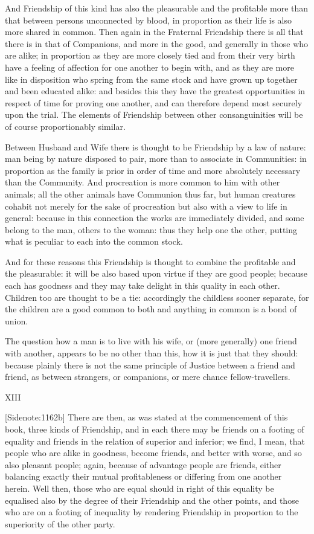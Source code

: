 And Friendship of this kind has also the pleasurable and the profitable
more than that between persons unconnected by blood, in proportion as
their life is also more shared in common. Then again in the Fraternal
Friendship there is all that there is in that of Companions, and more in
the good, and generally in those who are alike; in proportion as they
are more closely tied and from their very birth have a feeling of
affection for one another to begin with, and as they are more like in
disposition who spring from the same stock and have grown up together
and been educated alike: and besides this they have the greatest
opportunities in respect of time for proving one another, and can
therefore depend most securely upon the trial. The elements
of Friendship between other consanguinities will be of course
proportionably similar.

Between Husband and Wife there is thought to be Friendship by a law of
nature: man being by nature disposed to pair, more than to associate in
Communities: in proportion as the family is prior in order of time and
more absolutely necessary than the Community. And procreation is more
common to him with other animals; all the other animals have Communion
thus far, but human creatures cohabit not merely for the sake of
procreation but also with a view to life in general: because in this
connection the works are immediately divided, and some belong to the
man, others to the woman: thus they help one the other, putting what is
peculiar to each into the common stock.

And for these reasons this Friendship is thought to combine the
profitable and the pleasurable: it will be also based upon virtue if
they are good people; because each has goodness and they may take
delight in this quality in each other. Children too are thought to be a
tie: accordingly the childless sooner separate, for the children are a
good common to both and anything in common is a bond of union.

The question how a man is to live with his wife, or (more generally) one
friend with another, appears to be no other than this, how it is just
that they should: because plainly there is not the same principle
of Justice between a friend and friend, as between strangers, or
companions, or mere chance fellow-travellers.

XIII

[Sidenote:1162b] There are then, as was stated at the commencement of
this book, three kinds of Friendship, and in each there may be friends
on a footing of equality and friends in the relation of superior and
inferior; we find, I mean, that people who are alike in goodness, become
friends, and better with worse, and so also pleasant people; again,
because of advantage people are friends, either balancing exactly their
mutual profitableness or differing from one another herein. Well then,
those who are equal should in right of this equality be equalised also
by the degree of their Friendship and the other points, and those who
are on a footing of inequality by rendering Friendship in proportion to
the superiority of the other party.

